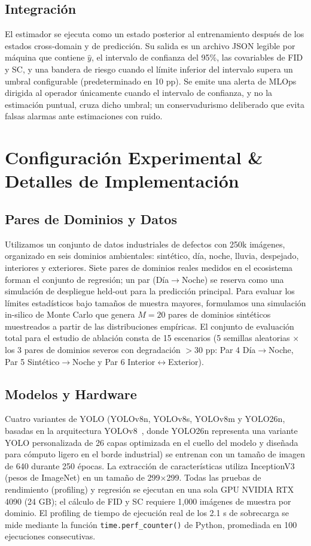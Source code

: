 \documentclass[10pt,twocolumn,letterpaper]{article}
\begin{document}
\subsection{Integración}
El estimador se ejecuta como un estado posterior al entrenamiento después de los estados cross-domain y de predicción. Su salida es un archivo JSON legible por máquina que contiene $\hat{y}$, el intervalo de confianza del 95\%, las covariables de FID y SC, y una bandera de riesgo cuando el límite inferior del intervalo supera un umbral configurable (predeterminado en 10 pp). Se emite una alerta de MLOps dirigida al operador únicamente cuando el intervalo de confianza, y no la estimación puntual, cruza dicho umbral; un conservadurismo deliberado que evita falsas alarmas ante estimaciones con ruido.

\section{Configuración Experimental \& Detalles de Implementación}

\subsection{Pares de Dominios y Datos}
Utilizamos un conjunto de datos industriales de defectos con 250k imágenes, organizado en seis dominios ambientales: sintético, día, noche, lluvia, despejado, interiores y exteriores. Siete pares de dominios reales medidos en el ecosistema forman el conjunto de regresión; un par (Día$\rightarrow$Noche) se reserva como una simulación de despliegue held-out para la predicción principal. Para evaluar los límites estadísticos bajo tamaños de muestra mayores, formulamos una simulación in-silico de Monte Carlo que genera $M=20$ pares de dominios sintéticos muestreados a partir de las distribuciones empíricas. El conjunto de evaluación total para el estudio de ablación consta de 15 escenarios (5 semillas aleatorias $\times$ los 3 pares de dominios severos con degradación $> 30$ pp: Par 4 Día$\rightarrow$Noche, Par 5 Sintético$\rightarrow$Noche y Par 6 Interior$\leftrightarrow$Exterior).

\subsection{Modelos y Hardware}
Cuatro variantes de YOLO (YOLOv8n, YOLOv8s, YOLOv8m y YOLO26n, basadas en la arquitectura YOLOv8~\cite{jocher2023yolo}, donde YOLO26n representa una variante YOLO personalizada de 26 capas optimizada en el cuello del modelo y diseñada para cómputo ligero en el borde industrial) se entrenan con un tamaño de imagen de 640 durante 250 épocas. La extracción de características utiliza InceptionV3 (pesos de ImageNet) en un tamaño de 299$\times$299. Todas las pruebas de rendimiento (profiling) y regresión se ejecutan en una sola GPU NVIDIA RTX 4090 (24 GB); el cálculo de FID y SC requiere 1,000 imágenes de muestra por dominio. El profiling de tiempo de ejecución real de los 2.1 s de sobrecarga se mide mediante la función \texttt{time.perf\_counter()} de Python, promediada en 100 ejecuciones consecutivas.
\end{document}
